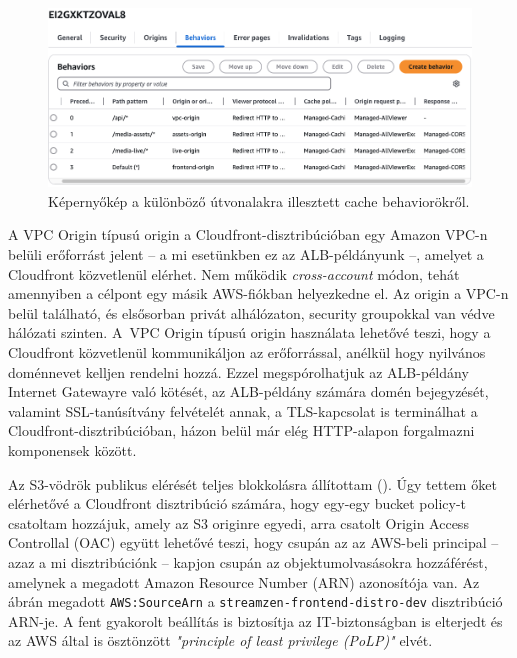 \begin{figure}[ht]
  \centering
  \includegraphics[width=150mm, keepaspectratio]{figures/distro_behav.png}
  \caption{Képernyőkép a különböző útvonalakra illesztett cache behaviorökről.}
  \label{fig:behav}
\end{figure}

A VPC Origin típusú origin a Cloudfront-disztribúcióban egy Amazon VPC-n belüli erőforrást jelent -- a mi esetünkben ez az ALB-példányunk --, amelyet a Cloudfront közvetlenül elérhet. Nem működik \emph{cross-account} módon, tehát amennyiben a célpont egy másik AWS-fiókban helyezkedne el. Az origin a VPC-n belül található, és elsősorban privát alhálózaton, security groupokkal van védve hálózati szinten. A~VPC Origin típusú origin használata lehetővé teszi, hogy a Cloudfront közvetlenül kommunikáljon az erőforrással, anélkül hogy nyilvános doménnevet kelljen rendelni hozzá. Ezzel megspórolhatjuk az ALB-példány Internet Gatewayre való kötését, az ALB-példány számára domén bejegyzését, valamint SSL-tanúsítvány felvételét annak, a TLS-kapcsolat is terminálhat a Cloudfront-disztribúcióban, házon belül már elég HTTP-alapon forgalmazni komponensek között.

Az S3-vödrök publikus elérését teljes blokkolásra állítottam (). Úgy tettem őket elérhetővé a Cloudfront disztribúció számára, hogy egy-egy bucket policy-t csatoltam hozzájuk, amely az S3 originre egyedi, arra csatolt Origin Access Controllal (OAC)\cite{oac} együtt lehetővé teszi, hogy csupán az az AWS-beli principal -- azaz a mi disztribúciónk -- kapjon csupán az objektumolvasásokra hozzáférést, amelynek a megadott Amazon Resource Number (ARN) azonosítója van. Az ábrán megadott \verb|AWS:SourceArn| a \verb|streamzen-frontend-distro-dev| disztribúció ARN-je. A fent gyakorolt beállítás is biztosítja az IT-biztonságban is elterjedt és az AWS által is ösztönzött \emph{"principle of least privilege (PoLP)"} elvét.

